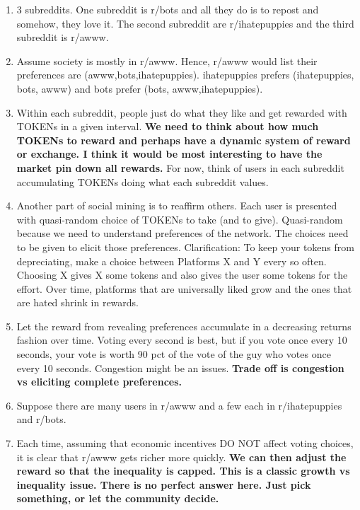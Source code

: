\begin{enumerate}
	\item 3 subreddits. One subreddit is r/bots and all they do is to repost and somehow, they love it. The second subreddit are r/ihatepuppies and the third subreddit is r/awww.
	
	\item Assume society is mostly in r/awww. Hence, r/awww would list their preferences are (awww,bots,ihatepuppies). ihatepuppies prefers (ihatepuppies, bots, awww) and bots prefer (bots, awww,ihatepuppies).
	
	\item Within each subreddit, people just do what they like and get rewarded with TOKENs in a given interval. \textbf{We need to think about how much TOKENs to reward and perhaps have a dynamic system of reward or exchange. I think it would be most interesting to have the market pin down all rewards.} For now, think of users in each subreddit accumulating TOKENs doing what each subreddit values.
	
	\item Another part of social mining is to reaffirm others. Each user is presented with quasi-random choice of TOKENs to take (and to give). Quasi-random because we need to understand preferences of the network. The choices need to be given to elicit those preferences. Clarification: To keep your tokens from depreciating, make a choice between Platforms X and Y every so often. Choosing X gives X some tokens and also gives the user some tokens for the effort. Over time, platforms that are universally liked grow and the ones that are hated shrink in rewards.
	
	\item Let the reward from revealing preferences accumulate in a decreasing returns fashion over time. Voting every second is best, but if you vote once every 10 seconds, your vote is worth 90 pct of the vote of the guy who votes once every 10 seconds. Congestion might be an issues. \textbf{Trade off is congestion vs eliciting complete preferences.}
	
	\item Suppose there are many users in r/awww and a few each in r/ihatepuppies and r/bots.
	
	\item Each time, assuming that economic incentives DO NOT affect voting choices, it is clear that r/awww gets richer more quickly. \textbf{We can then adjust the reward so that the inequality is capped. This is a classic growth vs inequality issue. There is no perfect answer here. Just pick something, or let the community decide.}
	
\end{enumerate}

